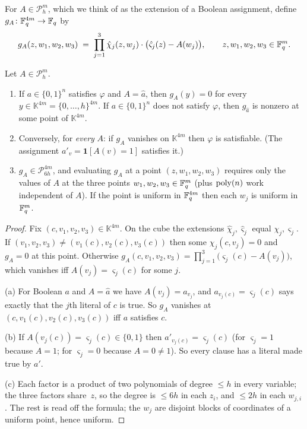 For $A\in\mathcal P^m_h$, which we think of as the extension of a Boolean assignment, define $g_A\colon\mathbb{F}_q^{4m}\to\mathbb{F}_q$ by
\[
  g_A(z,w_1,w_2,w_3)\;=\;\prod_{j=1}^3\hat\chi_j(z,w_j)\cdot\bigl(\hat\varsigma_j(z)-A(w_j)\bigr),\qquad z,w_1,w_2,w_3\in\mathbb{F}_q^m .
\]

\begin{lemma}\label{lem:arith}
Let $A\in\mathcal P^m_h$.
\begin{enumerate}[label=(\alph*)]
  \item If $a\in\{0,1\}^n$ satisfies $\varphi$ and $A=\hat a$, then $g_A(y)=0$ for every $y\in\mathbb K^{4m}=\{0,\dots,h\}^{4m}$.  If $a\in\{0,1\}^n$ does not satisfy $\varphi$, then $g_{\hat a}$
        is nonzero at some point of $\mathbb K^{4m}$.
  \item Conversely, for \emph{every} $A$: if $g_A$ vanishes on $\mathbb K^{4m}$ then $\varphi$ is satisfiable.  (The assignment $a'_v=\mathbf 1[A(v)=1]$ satisfies it.)
  \item $g_A\in\mathcal P^{4m}_{6h}$, and evaluating $g_A$ at a point $(z,w_1,w_2,w_3)$ requires only the values of $A$ at the three points
        $w_1,w_2,w_3\in\mathbb{F}_q^m$ (plus $\operatorname{poly}(n)$ work independent of $A$).  If the point is uniform in $\mathbb{F}_q^{4m}$ then each $w_j$ is uniform in $\mathbb{F}_q^m$.
\end{enumerate}
\end{lemma}
\begin{proof}
Fix $(c,v_1,v_2,v_3)\in\mathbb K^{4m}$.  On the cube the extensions $\hat\chi_j,\hat\varsigma_j$ equal $\chi_j,\varsigma_j$.  If $(v_1,v_2,v_3)\ne(v_1(c),v_2(c),v_3(c))$ then some $\chi_j(c,v_j)=0$ and $g_A=0$
at this point.  Otherwise
$g_A(c,v_1,v_2,v_3)=\prod_{j=1}^3\bigl(\varsigma_j(c)-A(v_j)\bigr)$, which vanishes iff $A(v_j)=\varsigma_j(c)$ for some $j$.

(a) For Boolean $a$ and $A=\hat a$ we have $A(v_j)=a_{v_j}$, and $a_{v_j(c)}=\varsigma_j(c)$ says exactly that the $j$th literal of $c$ is true.  So $g_A$ vanishes at $(c,v_1(c),v_2(c),v_3(c))$ iff $a$ satisfies $c$.

(b) If $A(v_j(c))=\varsigma_j(c)\in\{0,1\}$ then $a'_{v_j(c)}=\varsigma_j(c)$ (for $\varsigma_j=1$ because $A=1$; for $\varsigma_j=0$ because $A=0\ne1$).  So every clause has a literal made true by $a'$.

(c) Each factor is a product of two polynomials of degree $\le h$ in every variable; the three factors share~$z$, so the degree is $\le6h$ in each $z_i$, and $\le2h$ in each $w_{j,i}$.  The rest is read off
the formula; the $w_j$ are disjoint blocks of coordinates of a uniform point, hence uniform.
\end{proof}

